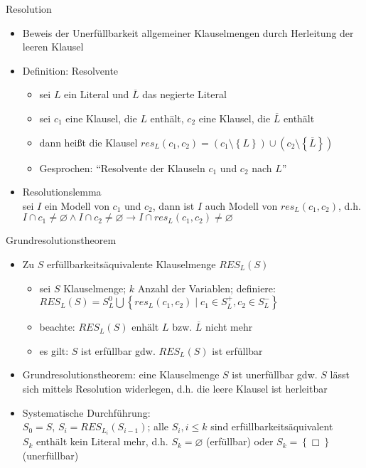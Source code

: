 \begin{frame}{Resolution}
	\begin{itemize}
		\item Beweis der Unerfüllbarkeit allgemeiner Klauselmengen durch Herleitung der leeren Klausel
		\item Definition: Resolvente
		\begin{itemize}
			\item sei $L$ ein Literal und $\overline{L}$ das negierte Literal
			\item sei $c_1$ eine Klausel, die $L$ enthält, $c_2$ eine Klausel, die $\overline{L}$ enthält
			\item dann heißt die Klausel $res_L(c_1, c_2)=\left(c_1 \setminus \left\{L\right\}\right) \cup \left(c_2 \setminus \left\{\overline{L}\right\}\right)$
			\item Gesprochen: "`Resolvente der Klauseln $c_1$ und $c_2$ nach $L$"'
		\end{itemize}
		\item Resolutionslemma\\
		sei $I$ ein Modell von $c_1$ und $c_2$, dann ist $I$ auch Modell von $res_L(c_1, c_2)$, d.h. $I \cap c_1 \neq \varnothing \land I \cap c_2 \neq \varnothing \rightarrow I \cap res_L(c_1, c_2) \neq \varnothing$
	\end{itemize}
\end{frame}

\begin{frame}{Grundresolutionstheorem}
	\begin{itemize}
		\item Zu $S$ erfüllbarkeitsäquivalente Klauselmenge $RES_L(S)$
		\begin{itemize}
			\item sei $S$ Klauselmenge; $k$ Anzahl der Variablen; definiere:\\
			$RES_L(S)=S_L^0 \bigcup \left\{res_L(c_1, c_2) \mid c_1 \in S_L^+, c_2 \in S_L^-\right\}$
			\item beachte: $RES_L(S)$ enhält $L$ bzw. $\overline{L}$ nicht mehr
			\item es gilt: $S$ ist erfüllbar gdw. $RES_L(S)$ ist erfüllbar
		\end{itemize}
		\item Grundresolutionstheorem: eine Klauselmenge $S$ ist unerfüllbar gdw. $S$ lässt sich mittels Resolution widerlegen, d.h. die leere Klausel ist herleitbar
		\item Systematische Durchführung:\\
		$S_0=S$, $S_i=RES_{L_i}\left(S_{i-1}\right)$; alle $S_i, i \leq k$ sind erfüllbarkeitsäquivalent\\
		$S_k$ enthält kein Literal mehr, d.h. $S_k=\varnothing$ (erfüllbar) oder $S_k=\left\{\Box\right\}$ (unerfüllbar)
	\end{itemize}
\end{frame}